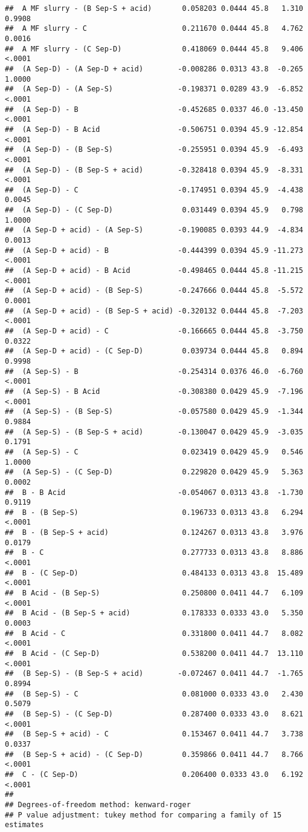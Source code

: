 \documentclass[
]{article}
\begin{document}
\begin{verbatim}
##  A MF slurry - (B Sep-S + acid)       0.058203 0.0444 45.8   1.310  0.9908
##  A MF slurry - C                      0.211670 0.0444 45.8   4.762  0.0016
##  A MF slurry - (C Sep-D)              0.418069 0.0444 45.8   9.406  <.0001
##  (A Sep-D) - (A Sep-D + acid)        -0.008286 0.0313 43.8  -0.265  1.0000
##  (A Sep-D) - (A Sep-S)               -0.198371 0.0289 43.9  -6.852  <.0001
##  (A Sep-D) - B                       -0.452685 0.0337 46.0 -13.450  <.0001
##  (A Sep-D) - B Acid                  -0.506751 0.0394 45.9 -12.854  <.0001
##  (A Sep-D) - (B Sep-S)               -0.255951 0.0394 45.9  -6.493  <.0001
##  (A Sep-D) - (B Sep-S + acid)        -0.328418 0.0394 45.9  -8.331  <.0001
##  (A Sep-D) - C                       -0.174951 0.0394 45.9  -4.438  0.0045
##  (A Sep-D) - (C Sep-D)                0.031449 0.0394 45.9   0.798  1.0000
##  (A Sep-D + acid) - (A Sep-S)        -0.190085 0.0393 44.9  -4.834  0.0013
##  (A Sep-D + acid) - B                -0.444399 0.0394 45.9 -11.273  <.0001
##  (A Sep-D + acid) - B Acid           -0.498465 0.0444 45.8 -11.215  <.0001
##  (A Sep-D + acid) - (B Sep-S)        -0.247666 0.0444 45.8  -5.572  0.0001
##  (A Sep-D + acid) - (B Sep-S + acid) -0.320132 0.0444 45.8  -7.203  <.0001
##  (A Sep-D + acid) - C                -0.166665 0.0444 45.8  -3.750  0.0322
##  (A Sep-D + acid) - (C Sep-D)         0.039734 0.0444 45.8   0.894  0.9998
##  (A Sep-S) - B                       -0.254314 0.0376 46.0  -6.760  <.0001
##  (A Sep-S) - B Acid                  -0.308380 0.0429 45.9  -7.196  <.0001
##  (A Sep-S) - (B Sep-S)               -0.057580 0.0429 45.9  -1.344  0.9884
##  (A Sep-S) - (B Sep-S + acid)        -0.130047 0.0429 45.9  -3.035  0.1791
##  (A Sep-S) - C                        0.023419 0.0429 45.9   0.546  1.0000
##  (A Sep-S) - (C Sep-D)                0.229820 0.0429 45.9   5.363  0.0002
##  B - B Acid                          -0.054067 0.0313 43.8  -1.730  0.9119
##  B - (B Sep-S)                        0.196733 0.0313 43.8   6.294  <.0001
##  B - (B Sep-S + acid)                 0.124267 0.0313 43.8   3.976  0.0179
##  B - C                                0.277733 0.0313 43.8   8.886  <.0001
##  B - (C Sep-D)                        0.484133 0.0313 43.8  15.489  <.0001
##  B Acid - (B Sep-S)                   0.250800 0.0411 44.7   6.109  <.0001
##  B Acid - (B Sep-S + acid)            0.178333 0.0333 43.0   5.350  0.0003
##  B Acid - C                           0.331800 0.0411 44.7   8.082  <.0001
##  B Acid - (C Sep-D)                   0.538200 0.0411 44.7  13.110  <.0001
##  (B Sep-S) - (B Sep-S + acid)        -0.072467 0.0411 44.7  -1.765  0.8994
##  (B Sep-S) - C                        0.081000 0.0333 43.0   2.430  0.5079
##  (B Sep-S) - (C Sep-D)                0.287400 0.0333 43.0   8.621  <.0001
##  (B Sep-S + acid) - C                 0.153467 0.0411 44.7   3.738  0.0337
##  (B Sep-S + acid) - (C Sep-D)         0.359866 0.0411 44.7   8.766  <.0001
##  C - (C Sep-D)                        0.206400 0.0333 43.0   6.192  <.0001
## 
## Degrees-of-freedom method: kenward-roger 
## P value adjustment: tukey method for comparing a family of 15 estimates
\end{verbatim}
\end{document}
